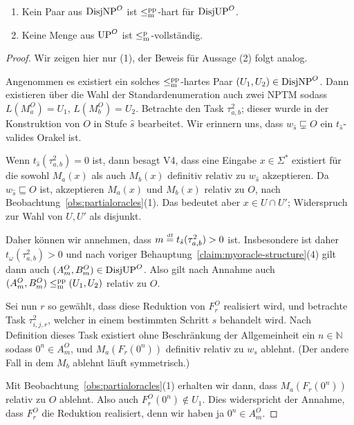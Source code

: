 \begin{claim}\label{claim:myoracle-completness}
    \begin{enumerate}
        \item Kein Paar aus $\mathrm{DisjNP}^O$ ist $\leq_\mathrm{m}^\mathrm{pp}$-hart für $\mathrm{DisjUP}^O$.
        \item Keine Menge aus $\mathrm{UP}^O$ ist $\leq_\mathrm{m}^\mathrm{p}$-vollständig.
    \end{enumerate}
\end{claim}
\begin{proof}
    Wir zeigen hier nur (1), der Beweis für Aussage (2) folgt analog.

    Angenommen es existiert ein solches $\leq_\mathrm{m}^\mathrm{pp}$-hartes Paar $(U_1, U_2)\in\mathrm{DisjNP}^O$.
    Dann existieren über die Wahl der Standardenumeration auch zwei NPTM sodass $L(M_a^O)=U_1$, $L(M_b^O)=U_2$.
    Betrachte den Task $\tau^2_{a,b}$; dieser wurde in der Konstruktion von $O$ in Stufe $\hat{s}$ bearbeitet.
    Wir erinnern uns, dass $w_{\hat{s}}\sqsubsetneq O$ ein $t_{\hat{s}}$-valides Orakel ist.

    Wenn $t_{\hat{s}}(\tau^2_{a,b})=0$ ist, dann besagt V4, dass eine Eingabe $x\in\Sigma^*$ existiert für die sowohl $M_a(x)$ als auch $M_b(x)$ definitiv relativ zu $w_{\hat{s}}$ akzeptieren. Da $w_{\hat{s}}\sqsubseteq O$ ist, akzeptieren $M_a(x)$ und $M_b(x)$ relativ zu $O$, nach Beobachtung~\ref{obs:partialoracles}(1).
    Das bedeutet aber $x\in U\cap U'$; Widerspruch zur Wahl von $U, U'$ als disjunkt.

    Daher können wir annehmen, dass $m\stackrel{\text{\smash{\tiny df}}}{=}  t_{\hat{s}}(\tau^2_{a,b})>0$ ist.
    Insbesondere ist daher $t_\omega(\tau^2_{a,b})>0$ und nach voriger Behauptung~\ref{claim:myoracle-structure}(4) gilt dann auch $(A^O_m, B^O_m)\in\mathrm{DisjUP}^O$. Also gilt nach Annahme auch $(A^O_m, B^O_m) \leq_\mathrm{m}^\mathrm{pp} (U_1, U_2)$ relativ zu $O$.
    
    Sei nun $r$ so gewählt, dass diese Reduktion von $F^O_r$ realisiert wird, und betrachte Task  $\tau^2_{i,j,r}$, welcher in einem bestimmten Schritt $s$ behandelt wird.
    Nach Definition dieses Task existiert ohne Beschränkung der Allgemeinheit ein $n\in\mathbb N$ sodass $0^n\in A_m^O$, und $M_a(F_r(0^n))$ definitiv relativ zu $w_s$ ablehnt. (Der andere Fall in dem $M_b$ ablehnt läuft symmetrisch.)

    Mit Beobachtung~\ref{obs:partialoracles}(1) erhalten wir dann, dass $M_a(F_r(0^n))$ relativ zu $O$ ablehnt. Also auch $F^O_r(0^n)\not\in U_1$. Dies widerspricht der Annahme, dass $F_r^O$ die Reduktion realisiert, denn wir haben ja $0^n\in A_m^O$.
\end{proof}

